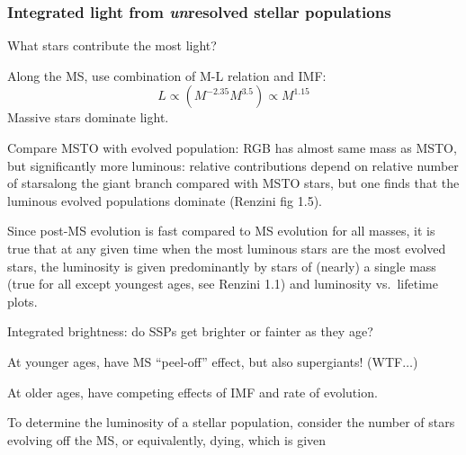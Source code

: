 \documentclass[12pt]{article}
\begin{document}
\subsubsection*{Integrated light from \emph{un}resolved stellar populations}
      \begin{itemize*}
        \item What stars contribute the most light?
            \begin{itemize*}
                \item Along the MS, use combination of M-L relation and IMF:
                    $$ L \propto (M^{-2.35}M^{3.5}) \propto M^{1.15} $$
                    Massive stars dominate light.
                \item Compare MSTO with evolved population: RGB has almost
                    same mass as MSTO, but significantly more luminous: relative
                    contributions depend on relative number of starsalong the
                    giant branch compared with MSTO stars, but one finds that
                    the luminous evolved populations dominate (Renzini fig 1.5).
                \item Since post-MS evolution is fast compared to MS evolution
                    for all masses, it is true that at any given time when the
                    most luminous stars are the most evolved stars, the luminosity
                    is given predominantly by stars of (nearly) a single mass
                    (true for all except youngest ages, see Renzini 1.1) and
                    luminosity vs.\ lifetime plots.
            \end{itemize*}
        \item Integrated brightness: do SSPs get brighter or fainter as they age?
            \begin{itemize*}
                \item At younger ages, have MS ``peel-off'' effect, but also
                    supergiants! (WTF$\ldots$)
                \item At older ages, have competing effects of IMF and rate of
                    evolution.
                    \begin{itemize*}
                        \item To determine the luminosity of a stellar
                            population, consider the number of stars evolving
                            off the MS, or equivalently, dying, which is given

\end{itemize*}
\end{itemize*}
\end{itemize*}
\end{document}
